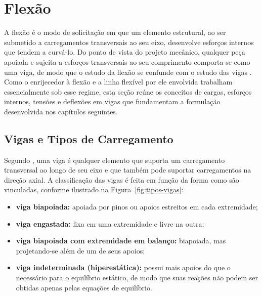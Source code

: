 \documentclass[arial,centeredequations,english,brazilian,oneside,section=TITLE]{ifes8}
\begin{document}

\section{Flexão}
\label{sec:flexao}

A flexão é o modo de solicitação em que um elemento estrutural, ao ser submetido a
carregamentos transversais ao seu eixo, desenvolve esforços internos que tendem a
curvá-lo. Do ponto de vista do projeto mecânico, qualquer peça apoiada e sujeita a
esforços transversais ao seu comprimento comporta-se como uma viga, de modo que o
estudo da flexão se confunde com o estudo das vigas \cite{Norton2013}. Como o
enrijecedor à flexão e a linha flexível por ele envolvida trabalham essencialmente sob
esse regime, esta seção reúne os conceitos de cargas, esforços internos, tensões e
deflexões em vigas que fundamentam a formulação desenvolvida nos capítulos seguintes.

\subsection{Vigas e Tipos de Carregamento}
\label{sub:vigas-carregamentos}

Segundo , uma viga é qualquer elemento que suporta um
carregamento transversal ao longo de seu eixo e que também pode suportar carregamentos
na direção axial. A classificação das vigas é feita em função da forma como são
vinculadas, conforme ilustrado na Figura~\ref{fig:tipos-vigas}:

\begin{itemize}
  \item \textbf{viga biapoiada:} apoiada por pinos ou apoios estreitos em cada
  extremidade;
  \item \textbf{viga engastada:} fixa em uma extremidade e livre na outra;
  \item \textbf{viga biapoiada com extremidade em balanço:} biapoiada, mas projetando-se
  além de um de seus apoios;
  \item \textbf{viga indeterminada (hiperestática):} possui mais apoios do que o
  necessário para o equilíbrio estático, de modo que suas reações não podem ser obtidas
  apenas pelas equações de equilíbrio.
\end{itemize}
\end{document}
